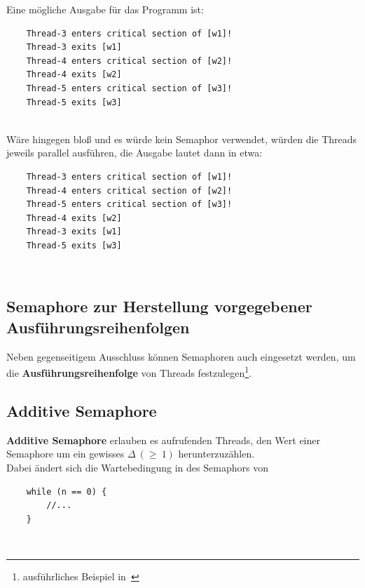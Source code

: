 Eine mögliche Ausgabe für das Programm ist:\\

\noindent
\begin{verbatim}
    Thread-3 enters critical section of [w1]!
    Thread-3 exits [w1]
    Thread-4 enters critical section of [w2]!
    Thread-4 exits [w2]
    Thread-5 enters critical section of [w3]!
    Thread-5 exits [w3]
\end{verbatim}\\

\noindent
Wäre  hingegen bloß  und es würde kein Semaphor verwendet, würden die Threads jeweils parallel  ausführen, die Ausgabe lautet dann in etwa:


\begin{verbatim}
    Thread-3 enters critical section of [w1]!
    Thread-4 enters critical section of [w2]!
    Thread-5 enters critical section of [w3]!
    Thread-4 exits [w2]
    Thread-3 exits [w1]
    Thread-5 exits [w3]
\end{verbatim}\\

\subsection{Semaphore zur Herstellung vorgegebener Ausführungsreihenfolgen}

Neben gegenseitigem Ausschluss können Semaphoren auch eingesetzt werden, um die \textbf{Ausführungsreihenfolge} von Threads festzulegen\footnote{ausführliches Beispiel in~\cite[104]{Oec22}}.

\subsection{Additive Semaphore}
\textbf{Additive Semaphore} erlauben es aufrufenden Threads, den Wert einer Semaphore um ein gewisses $\Delta\ (\geq\ 1)$ herunterzuzählen.\\

\noindent
Dabei ändert sich die Wartebedingung in des Semaphors von

\begin{verbatim}
    while (n == 0) {
        //...
    }
\end{verbatim}\\

